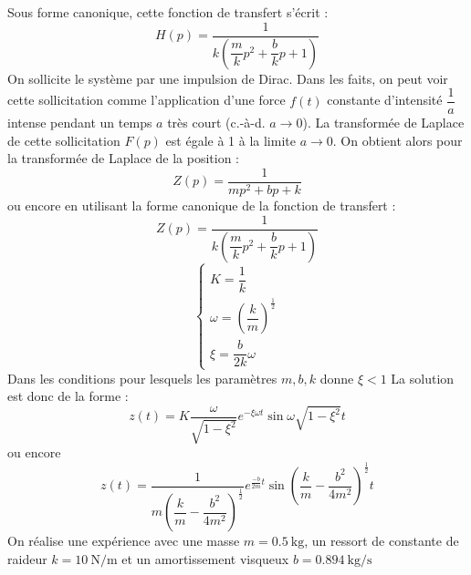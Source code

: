 Sous forme canonique, cette fonction de transfert s'écrit :
\[
    H(p)=\dfrac{1}{k\left(\dfrac{m}{k}p^2+\dfrac{b}{k}p+1\right)}
\]
On sollicite le système par une impulsion de Dirac. Dans les faits, on peut 
voir cette sollicitation comme l'application d'une force $f(t)$ constante 
d'intensité $\dfrac{1}{a}$ intense pendant un temps $a$ très court 
(c.-à-d. $a\to0$).    
La transformée de Laplace de cette sollicitation $F(p)$ est égale à 1 à 
la limite $a\to0$. On obtient alors pour la transformée de Laplace de la 
position :
\[
    Z(p)=\dfrac{1}{mp^2+bp+k}
\]
ou encore en utilisant la forme canonique de la fonction de transfert :
\[
    Z(p)=\dfrac{1}{k\left(\dfrac{m}{k}p^2+\dfrac{b}{k}p+1\right)}
\]
\[
    \begin{cases}
        K=\dfrac{1}{k}\\[1.5em]
        \omega=\left(\dfrac{k}{m}\right)^{\frac{1}{2}}\\[1.5em]
        \xi=\dfrac{b}{2k}\omega
    \end{cases}
\]
Dans les conditions pour lesquels les paramètres $m, b ,k$ donne $\xi<1$ 
La solution est donc de la forme :
\[
    z(t)=K\dfrac{\omega}{\sqrt{1-\xi^2}}
         e^{-\xi\omega t}\sin{\omega\sqrt{1-\xi^2} t} 
\]
ou encore 
\[
    z(t)=\dfrac{1}{m\left(\dfrac{k}{m}-\dfrac{b^2}{4m^2}\right)^{\frac{1}{2}}}
         e^{\frac{-b}{2m}t}\sin{\left(\dfrac{k}{m}-\dfrac{b^2}{4m^2}\right)^
         {\frac{1}{2}}t}
\]
On réalise une expérience avec une masse $m=\SI{0.5}{\kilogram}$, un ressort 
de constante de raideur $k=\SI{10}{\newton\per\meter}$ et un amortissement 
visqueux $b=\SI{0.894}{\kilogram\per\second}$
